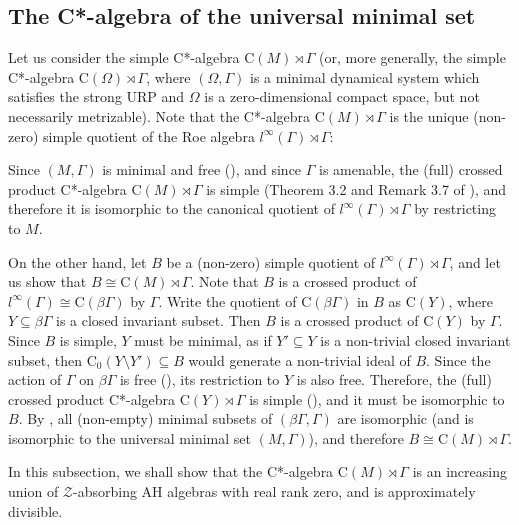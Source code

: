 \documentclass[12pt, oneside, psamsfonts]{amsart}
\theoremstyle{definition}
\theoremstyle{remark}
\numberwithin{equation}{section}
\begin{document}
\subsection{The C*-algebra of the universal minimal set} 
Let us consider the simple C*-algebra $\mathrm{C}(M) \rtimes \Gamma$ (or, more generally, the simple C*-algebra $\mathrm{C}(\Omega) \rtimes \Gamma$, where $(\Omega, \Gamma)$ is a minimal dynamical system which satisfies the strong URP and $\Omega$ is a zero-dimensional compact space, but not necessarily metrizable). Note that the C*-algebra $\mathrm{C}(M) \rtimes \Gamma$ is the unique (non-zero) simple quotient of the Roe algebra $l^\infty(\Gamma) \rtimes \Gamma$: 

Since $(M, \Gamma)$ is minimal and free (\cite{Ellis_1960}), and since $\Gamma$ is amenable, the (full) crossed product C*-algebra $\mathrm{C}(M)\rtimes\Gamma$ is simple (Theorem 3.2 and Remark 3.7 of \cite{Elliott_1980}), and therefore it is isomorphic to the canonical quotient of $l^\infty(\Gamma) \rtimes \Gamma$ by restricting to $M$.

On the other hand, let $B$ be a (non-zero) simple quotient of $l^\infty(\Gamma) \rtimes \Gamma$, and let us show that $B \cong \mathrm{C}(M)\rtimes\Gamma$. Note that $B$ is a crossed product of $l^\infty(\Gamma) \cong \mathrm{C}(\beta\Gamma)$ by $\Gamma$. Write the quotient of $\mathrm{C}(\beta\Gamma)$ in $B$ as $\mathrm{C}(Y)$, where $Y \subseteq \beta\Gamma$ is a closed invariant subset. Then $B$ is a crossed product of $\mathrm{C}(Y)$ by $\Gamma$. Since $B$ is simple, $Y$ must be minimal, as if $Y' \subseteq Y$ is a non-trivial closed invariant subset, then $\mathrm{C}_0(Y \setminus Y') \subseteq B$ would generate a  non-trivial ideal of $B$. Since the action of $\Gamma$ on $\beta\Gamma$ is free (\cite{Ellis_1960}), its restriction to $Y$ is also free. Therefore, the (full) crossed product C*-algebra $\mathrm{C}(Y)\rtimes\Gamma$ is simple (\cite{Elliott_1980}), and it must be isomorphic to $B$. By \cite{Ellis_1960}, all (non-empty) minimal subsets of $(\beta\Gamma, \Gamma)$ are isomorphic (and is isomorphic to the universal minimal set $(M , \Gamma)$), and therefore $B \cong \mathrm{C}(M)\rtimes\Gamma$.


In this subsection, we shall show that the C*-algebra $\mathrm{C}(M) \rtimes\Gamma$ is an increasing union of $\mathcal Z$-absorbing AH algebras with real rank zero, and is approximately divisible. 
\end{document}
